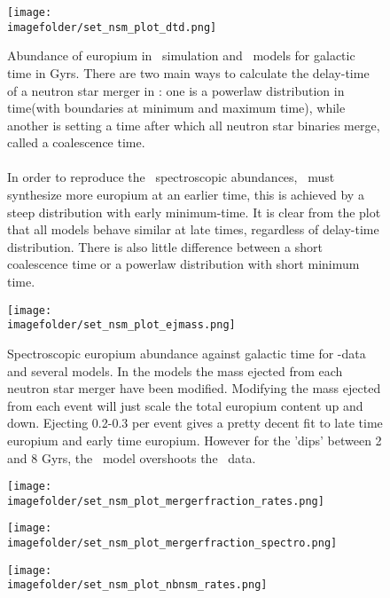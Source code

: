 \begin{figure}[h]
  \centering
  \texttt{[image: \\imagefolder/set\_nsm\_plot\_dtd.png]}
  \caption{\label{fig:fit-v3-dtd}
    Abundance of europium in \eris\ simulation and \omegamodel\ models for galactic time in Gyrs.
    There are two main ways to calculate the delay-time of a neutron star merger in \omegamodel: one is a powerlaw distribution in time(with boundaries at minimum and maximum time), while another is setting a time after which all neutron star binaries merge, called a coalescence time.
    \\  \\
    In order to reproduce the \eris\ spectroscopic abundances, \omegamodel\ must synthesize more europium at an earlier time, this is achieved by a steep distribution with early minimum-time. It is clear from the plot that all models behave similar at late times, regardless of delay-time distribution. There is also little difference between a short coalescence time or a powerlaw distribution with short minimum time.
  }
\end{figure}
\begin{figure}[h]
  \centering
  \texttt{[image: \\imagefolder/set\_nsm\_plot\_ejmass.png]}
  \caption{\label{fig:fit-v3-ejecta}
    Spectroscopic europium abundance against galactic time for \eris-data and several \omegamodel models. In the models the mass ejected from each neutron star merger have been modified.
    Modifying the mass ejected from each event will just scale the total europium content up and down.
    Ejecting 0.2-0.3 \msol per event gives a pretty decent fit to late time europium and early time europium.
    However for the 'dips' between 2 and 8 Gyrs, the \omegamodel\ model overshoots the \eris\ data.
  }
\end{figure}
\begin{figure}[h]
  \centering
  \texttt{[image: \\imagefolder/set\_nsm\_plot\_mergerfraction\_rates.png]}
  \caption{\label{fig:fit-v3-mergerfrac-nsmr}}
\end{figure}
\begin{figure}[h]
  \centering
  \texttt{[image: \\imagefolder/set\_nsm\_plot\_mergerfraction\_spectro.png]}
  \caption{\label{fig:fit-v3-mergerfrac-euro}}
\end{figure}
\begin{figure}[h]
  \centering
  \texttt{[image: \\imagefolder/set\_nsm\_plot\_nbnsm\_rates.png]}
  \caption{\label{fig:fit-v3-number-nsmr}}
\end{figure}
